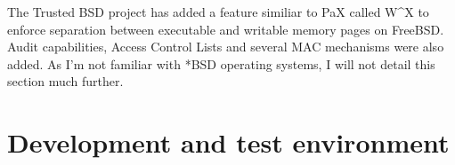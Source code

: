 \documentclass[pdftex,a4paper,titlepage,11pt]{article}
\begin{document}
The Trusted BSD project \cite{trustedbsdproject} has added a feature
similiar to PaX called W\^{}X to enforce separation between executable and
writable memory pages on FreeBSD. Audit capabilities, Access Control Lists and
several MAC mechanisms were also added. As I'm not familiar with *BSD operating
systems, I will not detail this section much further.

%

%
%
%

\newpage

\section{Development and test environment}
\end{document}
